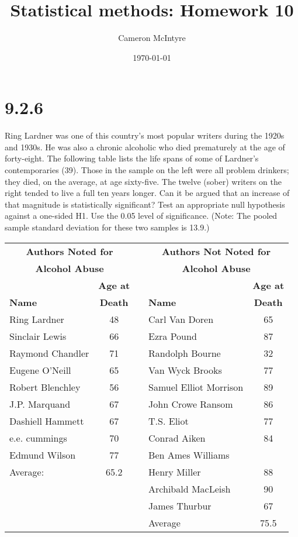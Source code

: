 \documentclass[svgnames]{article}
\title{Statistical methods: Homework 10}
\author{Cameron McIntyre}
\date{\today}
\begin{document}
\maketitle

\section{9.2.6}

Ring Lardner was one of this country’s most popular writers during the 1920s and 1930s. He was also a chronic alcoholic who died prematurely at the age of forty-eight. The following table lists the life spans of some of Lardner’s contemporaries (39). Those in the sample on the left were all problem drinkers; they died, on the average, at age sixty-five. The twelve (sober) writers on the right tended to live a full ten years longer. Can it be argued that an increase of that magnitude is statistically significant? Test an appropriate null hypothesis against a one-sided H1. Use the 0.05 level of significance. (Note: The pooled sample standard deviation for these two samples is 13.9.)

\begin{table}[H]
\centering
 \begin{tabular}{l c c l c} 
 \hline
\multicolumn{2}{c}{\bf Authors Noted for}  & & \multicolumn{2}{c}{\bf Authors Not Noted for} \\
\multicolumn{2}{c}{\bf Alcohol Abuse}  & &\multicolumn{2}{c}{\bf Alcohol Abuse}\\
\cline{1-2} \cline{4-5} 
\bf  & \bf Age at && \bf  & \bf Age at \\
\bf  Name & \bf Death && \bf  Name& \bf Death \\
\hline
Ring Lardner & 48  && Carl Van Doren  & 65 \\
Sinclair Lewis &  66  && Ezra Pound &  87  \\
Raymond Chandler &  71  && Randolph Bourne &  32  \\
Eugene O'Neill  & 65 &&  Van Wyck Brooks  & 77\\
Robert Blenchley & 56 && Samuel Elliot Morrison & 89\\
J.P. Marquand & 67 && John Crowe Ransom & 86\\
Dashiell Hammett & 67 && T.S. Eliot & 77 \\
e.e. cummings & 70 && Conrad Aiken & 84\\
Edmund Wilson & 77 && Ben Ames Williams \\
Average: & 65.2  && Henry Miller & 88 \\
&   && Archibald MacLeish & 90 \\
&   && James Thurbur & 67 \\
&   && Average & 75.5 \\
 \hline
 \end{tabular}
\end{table}
\end{document}
